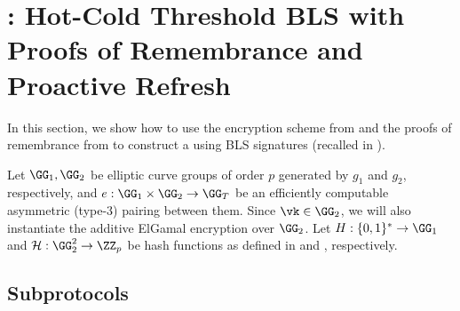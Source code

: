 \section{\sysname: Hot-Cold Threshold BLS with\texorpdfstring{\\}{} Proofs of Remembrance and Proactive Refresh}\label{sec:bls-construction}

% 
In this section, we show how to use the encryption scheme from  and the proofs of remembrance from  to construct a \hcwl using BLS signatures (recalled in ). 

Let $\GG_1, \GG_2$ be elliptic curve groups of order $p$ generated by $g_1$ and $g_2$, respectively, and $e: \GG_1 \times \GG_2 \rightarrow \GG_T$ be an efficiently computable asymmetric (type-3) pairing between them. 
Since $\vk \in \GG_2$, we will also instantiate the additive ElGamal encryption over $\GG_2$. 
Let $\blshash: \{0, 1\}^* \rightarrow \GG_1$ and $\lhlhash: \GG_2^2 \rightarrow \ZZ_p$ be hash functions as defined in  and , respectively.

\subsection{Subprotocols}




